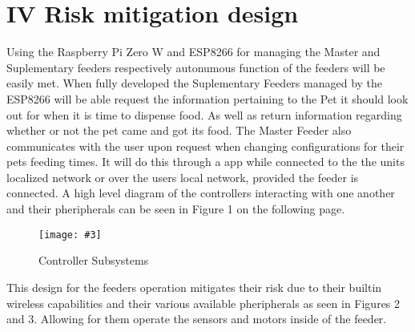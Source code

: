 \documentclass[12pt]{article}
\newcounter{engineering}
\newcommand{\nimg}[4][width=\textwidth]{
    \begin{figure}[H]
        \centering
        \texttt{[image: \#3]}
        \caption{#4}
        \label{#2}
    \end{figure}
}
\begin{document}
\section{IV Risk mitigation design}

Using the Raspberry Pi Zero W and ESP8266 for managing the Master and
Suplementary feeders respectively autonumous function of the feeders will be easily met.
When fully developed the Suplementary Feeders managed by the ESP8266 will be able request
the information pertaining to the Pet it should look out for when it is time to dispense food.
As well as return information regarding whether or not the pet came and got its food.  The 
Master Feeder also communicates with the user upon request when changing configurations 
for their pets feeding times.  It will do this through a app while connected to the the units 
localized network or over the users local network, provided the feeder is connected.  A high
level diagram of the controllers interacting with one another and their pheripherals can be seen in Figure 1 on
the following page. 

    \nimg [height = 3.00 in]{Risk}{pics/subsystems.png}{Controller Subsystems}

This design for the feeders operation mitigates their risk due to their builtin wireless capabilities and
their various available pheripherals as seen in Figures 2 and 3.  Allowing for them operate the sensors
and motors inside of the feeder.  
\end{document}
